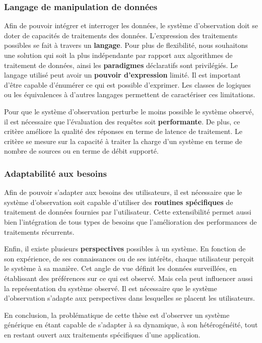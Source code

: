 \subsubsection{Langage de manipulation de données}
Afin de pouvoir intégrer et interroger les données, le système d'observation doit se doter de capacités de traitements des données. L'expression des traitements possibles se fait à travers un \textbf{langage}. Pour plus de flexibilité, nous souhaitons une solution qui soit la plus indépendante par rapport aux algorithmes de traitement de données, ainsi les \textbf{paradigmes} déclaratifs sont privilégiés. Le langage utilisé peut avoir un \textbf{pouvoir d'expression} limité. Il est important d'être capable d'énumérer ce qui est possible d'exprimer. Les classes de logiques ou les équivalences à d'autres langages permettent de caractériser ces limitations.

Pour que le système d'observation perturbe le moins possible le système observé, il est nécessaire que l'évaluation des requêtes soit \textbf{performante}. De plus, ce critère améliore la qualité des réponses en terme de latence de traitement. Le critère se mesure sur la capacité à traiter la charge d'un système en terme de nombre de sources ou en terme de débit supporté.

\subsubsection{Adaptabilité aux besoins}
Afin de pouvoir s'adapter aux besoins des utilisateurs, il est nécessaire que le système d'observation soit capable d'utiliser des \textbf{routines spécifiques} de traitement de données fournies par l'utilisateur. Cette extensibilité permet aussi bien l'intégration de tous types de besoins que l'amélioration des performances de traitements récurrents.

Enfin, il existe plusieurs \textbf{perspectives} possibles à un système. En fonction de son expérience, de ses connaissances ou de ses intérêts, chaque utilisateur perçoit le système à sa manière. Cet angle de vue définit les données surveillées, en établissant des préférences sur ce qui est observé. Mais cela peut influencer aussi la représentation du système observé. Il est nécessaire que le système d'observation s'adapte aux perspectives dans lesquelles se placent les utilisateurs.

En conclusion, la problématique de cette thèse est d'observer un système générique en étant capable de s'adapter à sa dynamique, à son hétérogénéité, tout en restant ouvert aux traitements spécifiques d'une application.
